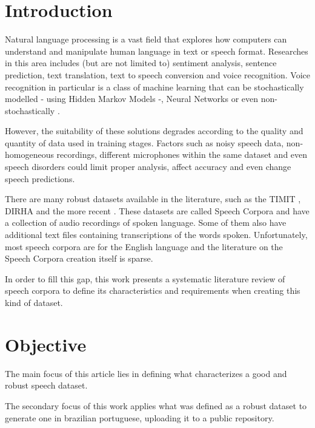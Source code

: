 \chapter*[Introduction]{Introduction}

Natural language processing is a vast field that explores how computers can understand and manipulate human language in text or speech format. Researches in this area includes (but are not limited to) sentiment analysis, sentence prediction, text translation, text to speech conversion and voice recognition. Voice recognition in particular is a class of machine learning that can be stochastically modelled - using Hidden Markov Models \cite{gales2008application} -, Neural Networks \cite{graves2013speech} or even non-stochastically \cite{burget2003nonrandomattr}.

However, the suitability of these solutions degrades according to the quality and quantity of data used in training stages. Factors such as noisy speech data, non-homogeneous recordings, different microphones within the same dataset and even speech disorders could limit proper analysis, affect accuracy and even change speech predictions. 

There are many robust datasets available in the literature, such as the TIMIT \cite{Lamel1992timmit}, DIRHA \cite{Ravanelli2016dirha} and the more recent \cite{chanchaochai2018globaltimit}. These datasets are called Speech Corpora and have a collection of audio recordings of spoken language. Some of them also have additional text files containing transcriptions of the words spoken. Unfortunately, most speech corpora are for the English language \cite{LeRouxVincent2014TRdatasets} and the literature on the Speech Corpora creation itself is sparse. 

In order to fill this gap, this work presents a systematic literature review of speech corpora to define its characteristics and requirements when creating this kind of dataset.

\chapter{Objective}

The main focus of this article lies in defining what characterizes a good and robust speech dataset.

The secondary focus of this work applies what was defined as a robust dataset to generate one in brazilian portuguese, uploading it to a public repository. 
